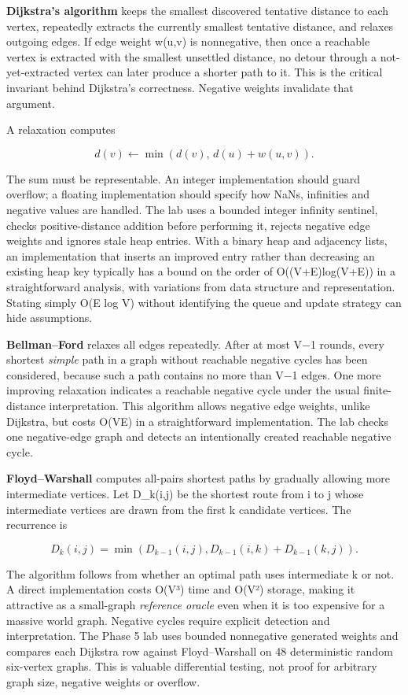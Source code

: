 \textbf{Dijkstra's algorithm} keeps the smallest discovered tentative distance to each vertex, repeatedly extracts the currently smallest tentative distance, and relaxes outgoing edges. If edge weight w(u,v) is nonnegative, then once a reachable vertex is extracted with the smallest unsettled distance, no detour through a not-yet-extracted vertex can later produce a shorter path to it. This is the critical invariant behind Dijkstra's correctness. Negative weights invalidate that argument.

A relaxation computes

\[
d(v)\leftarrow\min(d(v),\,d(u)+w(u,v)).
\]

The sum must be representable. An integer implementation should guard overflow; a floating implementation should specify how NaNs, infinities and negative values are handled. The lab uses a bounded integer infinity sentinel, checks positive-distance addition before performing it, rejects negative edge weights and ignores stale heap entries. With a binary heap and adjacency lists, an implementation that inserts an improved entry rather than decreasing an existing heap key typically has a bound on the order of O((V+E)log(V+E)) in a straightforward analysis, with variations from data structure and representation. Stating simply O(E log V) without identifying the queue and update strategy can hide assumptions.

\textbf{Bellman--Ford} relaxes all edges repeatedly. After at most V−1 rounds, every shortest \emph{simple} path in a graph without reachable negative cycles has been considered, because such a path contains no more than V−1 edges. One more improving relaxation indicates a reachable negative cycle under the usual finite-distance interpretation. This algorithm allows negative edge weights, unlike Dijkstra, but costs O(VE) in a straightforward implementation. The lab checks one negative-edge graph and detects an intentionally created reachable negative cycle.

\textbf{Floyd--Warshall} computes all-pairs shortest paths by gradually allowing more intermediate vertices. Let D\_k(i,j) be the shortest route from i to j whose intermediate vertices are drawn from the first k candidate vertices. The recurrence is

\[
D_k(i,j)=\min\!\left(D_{k-1}(i,j),
D_{k-1}(i,k)+D_{k-1}(k,j)\right).
\]

The algorithm follows from whether an optimal path uses intermediate k or not. A direct implementation costs O(V³) time and O(V²) storage, making it attractive as a small-graph \emph{reference oracle} even when it is too expensive for a massive world graph. Negative cycles require explicit detection and interpretation. The Phase 5 lab uses bounded nonnegative generated weights and compares each Dijkstra row against Floyd--Warshall on 48 deterministic random six-vertex graphs. This is valuable differential testing, not proof for arbitrary graph size, negative weights or overflow.

